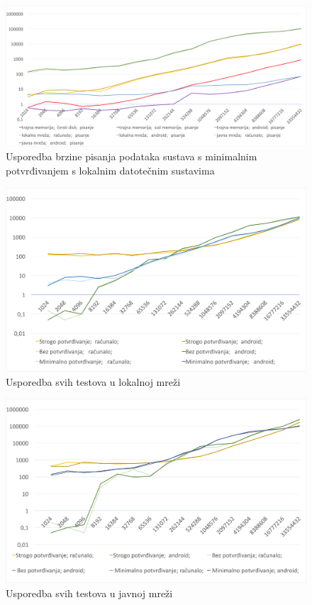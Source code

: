 \documentclass[times, utf8, zavrsni, square]{fer}
\begin{document}
\begin{figure}[t]
    \centering
    \includegraphics[width=1\textwidth]{3_graf}
    \caption{Usporedba brzine pisanja podataka sustava s minimalnim potvrđivanjem s lokalnim datotečnim sustavima}
    \label{fig:rez_1}
\end{figure}
\begin{figure}[t]
    \centering
    \includegraphics[width=1\textwidth]{3_2_1_lokalna}
    \caption{Usporedba svih testova u lokalnoj mreži}
    \label{fig:rez_1}
\end{figure}
\begin{figure}[t]
    \centering
    \includegraphics[width=1\textwidth]{3_2_1_javna}
    \caption{Usporedba svih testova u javnoj mreži}
    \label{fig:rez_1}
\end{figure}
\FloatBarrier
\end{document}
